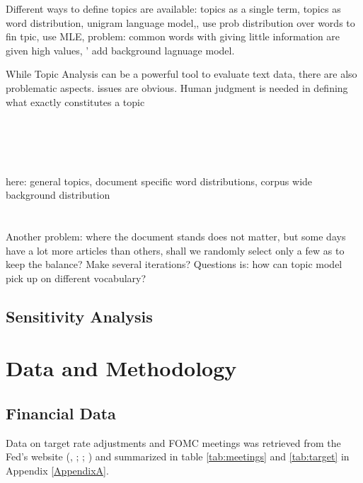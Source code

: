 \documentclass[11pt,a4paper,english,oneside]{book}
\numberwithin{equation}{chapter}
\begin{document}
Different ways to define topics are available: topics as a single term, topics as word distribution,
unigram language model,, use prob distribution over words to fin tpic, use MLE, problem: common words with giving little information are given high values, ' add background lagnuage model.  

While Topic Analysis can be a powerful tool to evaluate text data, there are also problematic aspects. issues are obvious. Human judgment is needed in defining what exactly constitutes a topic

\cite{Hoffman2010} \\
\cite{Steyvers(2007)}\\
\cite{Blei.2003}\\
\cite{Asuncion.2009}\\
here:  general topics, document specific word distributions, corpus wide background distribution \cite{Chem.2007}\\
\cite{Bishop.2006}\\
\cite{Darling.2011}\\

Another problem: where the document stands does not matter, but some days have a lot more articles than others, shall we randomly select only a few as to keep the balance? Make several iterations? Questions is: how can topic model pick up on different vocabulary?


\section{Sensitivity Analysis}




\chapter{Data and Methodology}


\section{Financial Data}

Data on target rate adjustments and FOMC meetings was retrieved from the Fed's website (\citealp{FRS.2018}, \citeyear{FRS.2013}; \citealp{FOMC.2018Archive}; \citeyear{FOMC.2018}) and summarized in table \ref{tab:meetings} and \ref{tab:target} in Appendix \ref{AppendixA}. 
\end{document}
